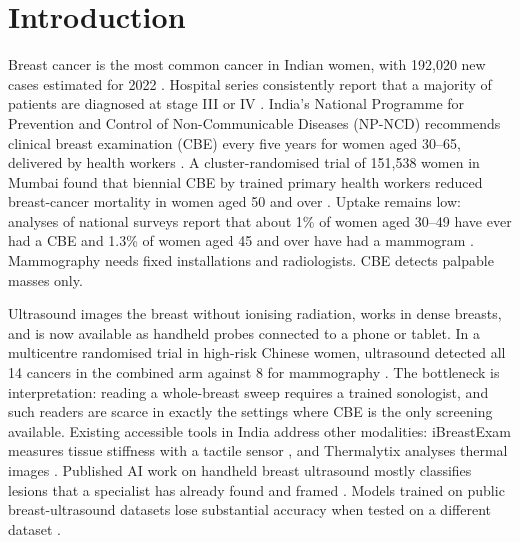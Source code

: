 \section{Introduction}
 Breast cancer is the most common cancer in Indian women, with 192{,}020 new cases estimated for 2022 \cite{globocan2022}. Hospital series consistently report that a majority of patients are diagnosed at stage III or IV \cite{iips2023}. India's National Programme for Prevention and Control of Non-Communicable Diseases (NP-NCD) recommends clinical breast examination (CBE) every five years for women aged 30--65, delivered by health workers \cite{npncd}. A cluster-randomised trial of 151{,}538 women in Mumbai found that biennial CBE by trained primary health workers reduced breast-cancer mortality in women aged 50 and over \cite{mittra2021}. Uptake remains low: analyses of national surveys report that about 1\% of women aged 30--49 have ever had a CBE and 1.3\% of women aged 45 and over have had a mammogram \cite{bmcph2025}. Mammography needs fixed installations and radiologists. CBE detects palpable masses only.

 Ultrasound images the breast without ionising radiation, works in dense breasts, and is now available as handheld probes connected to a phone or tablet. In a multicentre randomised trial in high-risk Chinese women, ultrasound detected all 14 cancers in the combined arm against 8 for mammography \cite{shen2015}. The bottleneck is interpretation: reading a whole-breast sweep requires a trained sonologist, and such readers are scarce in exactly the settings where CBE is the only screening available. Existing accessible tools in India address other modalities: iBreastExam measures tissue stiffness with a tactile sensor \cite{ibreastexam2022}, and Thermalytix analyses thermal images \cite{thermalytix2024}. Published AI work on handheld breast ultrasound mostly classifies lesions that a specialist has already found and framed \cite{handheldreview2025,berg2023}. Models trained on public breast-ultrasound datasets lose substantial accuracy when tested on a different dataset \cite{shiftbenchmark2026}.

